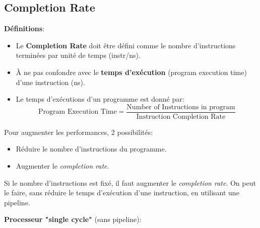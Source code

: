 \documentclass[a4paper]{article}
\begin{document}
\subsection{Completion Rate}

\textbf{Définitions}:
\begin{itemize}
    \item Le \textbf{Completion Rate} doit être défini comme le nombre d’instructions terminées par unité de temps (instr/ns).
    \item À ne pas confondre avec le \textbf{temps d'exécution} (program execution time) d’une instruction (ns).
    \item Le temps d'exécutions d'un programme est donné par:
    \[
        \text{Program Execution Time} = \frac{\text{Number of Instructions in program}}{\text{Instruction Completion Rate}}
    \]
\end{itemize}

Pour augmenter les performances, 2 possibilités:
\begin{itemize}
    \item Réduire le nombre d’instructions du programme.
    \item Augmenter le \textit{completion rate}.
\end{itemize}
Si le nombre d'instructions est fixé, il faut augmenter le \textit{completion rate}. On peut le faire, sans réduire le temps d'exécution d'une instruction, en utilisant une pipeline.

\textbf{Processeur "single cycle"} (sans pipeline):
\begin{center}
\end{center}
\end{document}
